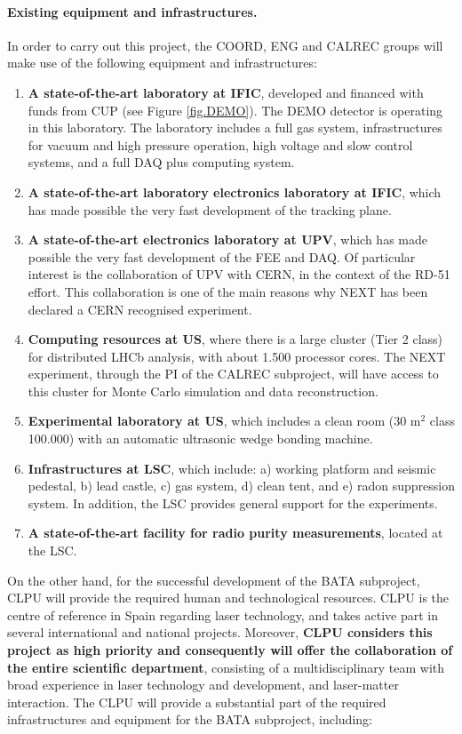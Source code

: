 \paragraph{Existing equipment and infrastructures.}

In order to carry out this project, the COORD, ENG and CALREC groups will make use of the following equipment and infrastructures:

\begin{enumerate}
\item {\bf A state-of-the-art laboratory at IFIC}, developed and financed with funds from CUP (see Figure \ref{fig.DEMO}). The DEMO detector is operating in this laboratory. The laboratory includes a full gas system, infrastructures for vacuum and high pressure operation, high voltage and slow control systems, and a full DAQ plus computing system. 
\item {\bf A state-of-the-art laboratory electronics laboratory at IFIC}, which has made possible the very fast development of the tracking plane. 
\item {\bf A state-of-the-art electronics laboratory at UPV}, which has made possible the very fast development of the FEE and DAQ. Of particular interest is the collaboration of UPV with CERN, in the context of the RD-51 effort. This collaboration is one of the main reasons why NEXT has been declared a CERN recognised experiment.
\item {\bf Computing resources at US}, where there is a large cluster (Tier 2 class) for distributed LHCb analysis, with about 1.500 processor cores. The NEXT experiment, through the PI of the CALREC subproject, will have access to this cluster for Monte Carlo simulation and data reconstruction. 
\item {\bf Experimental laboratory at US}, which includes a clean room (30 m$^2$ class 100.000) with an automatic ultrasonic wedge bonding machine. 
\item {\bf Infrastructures at LSC}, which include: a) working platform and seismic pedestal, b) lead castle, c) gas system, d) clean tent, and e) radon suppression system. In addition, the LSC provides general support for the experiments. 
\item {\bf A state-of-the-art facility for radio purity measurements}, located at the LSC. 
\end{enumerate}

On the other hand, for the successful development of the BATA subproject, CLPU will provide the required human and technological resources. CLPU is the centre of reference in Spain regarding laser technology, and takes active part in several international and national projects.  Moreover, {\bf CLPU considers this project as high priority and consequently will offer the collaboration of the entire scientific department}, consisting of a multidisciplinary team with broad experience in laser technology and development, and laser-matter interaction. The CLPU will provide a substantial part of the required infrastructures and equipment for the BATA subproject, including:
 
